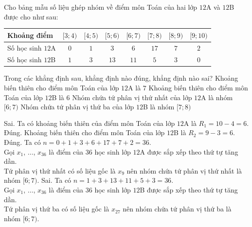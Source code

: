 \begin{ex}%
	Cho bảng mẫu số liệu ghép nhóm về điểm môn Toán của hai lớp $12$A và $12$B được cho như sau:
	\begin{center}
		\begin{tabular}{|>{\centering\arraybackslash}m{3cm}|c|c|c|c|c|c|c|}
			\hline
			Khoảng điểm & $[3;4)$ & $[4; 5)$ & $[5; 6)$ & $[6; 7)$ & $[7; 8)$ & $[8; 9)$ & $[9; 10)$ \\ \hline
			Số học sinh $12$A & $0$ & $1$ & $3$ & $6$ & $17$ & $7$ & $2$ \\ \hline
			Số học sinh $12$B & $1$ & $3$ & $13$ &$11$ & $5$ & $3$ & $0$ \\ \hline
		\end{tabular}
	\end{center}
	Trong các khẳng định sau, khẳng định nào đúng, khẳng định nào sai?
	\choiceTF
	{Khoảng biến thiên cho điểm môn Toán của lớp $12$A là $7$}
	{\True Khoảng biến thiên cho điểm môn Toán của lớp $12$B là $6$}
	{\True Nhóm chứa tứ phân vị thứ nhất của lớp $12$A là nhóm $[6; 7)$}
	{Nhóm chứa tứ phân vị thứ ba của lớp $12$B là nhóm $[7; 8)$}
	\loigiai
	{
		\begin{itemchoice}
			\itemch Sai. Ta có khoảng biến thiên của điểm môn Toán của lớp $12$A là $R_1 = 10 -4 = 6$. \\
			\itemch Đúng. Khoảng biến thiên cho điểm môn Toán của lớp $12$B là $R_2 = 9 - 3 = 6$. 
			\itemch Đúng. Ta có $n = 0 + 1 + 3 + 6 + 17 + 7 + 2 = 36$.\\
			Gọi $x_1$, $\ldots$, $x_{36}$ là điểm của $36$ học sinh lớp $12$A được sắp xếp theo thứ tự tăng dần. \\
			Tứ phân vị thứ nhất có số liệu gốc là $x_9$ nên nhóm chứa tứ phân vị thứ nhất là nhóm $[6; 7)$.
			\itemch Sai. Ta có $n = 1 + 3 + 13 + 11 + 5 + 3 = 36$.\\
			Gọi $x_1$, $\ldots$, $x_{36}$ là điểm của $36$ học sinh lớp $12$B được sắp xếp theo thứ tự tăng dần. \\
			Tứ phân vị thứ ba có số liệu gốc là $x_{27}$ nên nhóm chứa tứ phân vị thứ ba là nhóm $[6; 7)$.
		\end{itemchoice}
	}
\end{ex}

